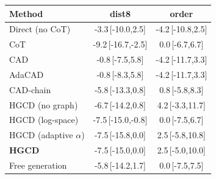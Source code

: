 \begin{tabular}{lcc}
\toprule
Method & dist8 & order \\
\midrule
Direct (no CoT) & -3.3\,{\scriptsize[-10.0,2.5]} & -4.2\,{\scriptsize[-10.8,2.5]} \\
CoT & -9.2\,{\scriptsize[-16.7,-2.5]} & 0.0\,{\scriptsize[-6.7,6.7]} \\
CAD & -0.8\,{\scriptsize[-7.5,5.8]} & -4.2\,{\scriptsize[-11.7,3.3]} \\
AdaCAD & -0.8\,{\scriptsize[-8.3,5.8]} & -4.2\,{\scriptsize[-11.7,3.3]} \\
CAD-chain & -5.8\,{\scriptsize[-13.3,0.8]} & 0.8\,{\scriptsize[-5.8,8.3]} \\
HGCD (no graph) & -6.7\,{\scriptsize[-14.2,0.8]} & 4.2\,{\scriptsize[-3.3,11.7]} \\
HGCD (log-space) & -7.5\,{\scriptsize[-15.0,-0.8]} & 0.0\,{\scriptsize[-7.5,6.7]} \\
HGCD (adaptive $\alpha$) & -7.5\,{\scriptsize[-15.8,0.0]} & 2.5\,{\scriptsize[-5.8,10.8]} \\
\textbf{HGCD} & -7.5\,{\scriptsize[-15.0,0.0]} & 2.5\,{\scriptsize[-5.0,10.0]} \\
Free generation & -5.8\,{\scriptsize[-14.2,1.7]} & 0.0\,{\scriptsize[-7.5,7.5]} \\
\bottomrule
\end{tabular}
